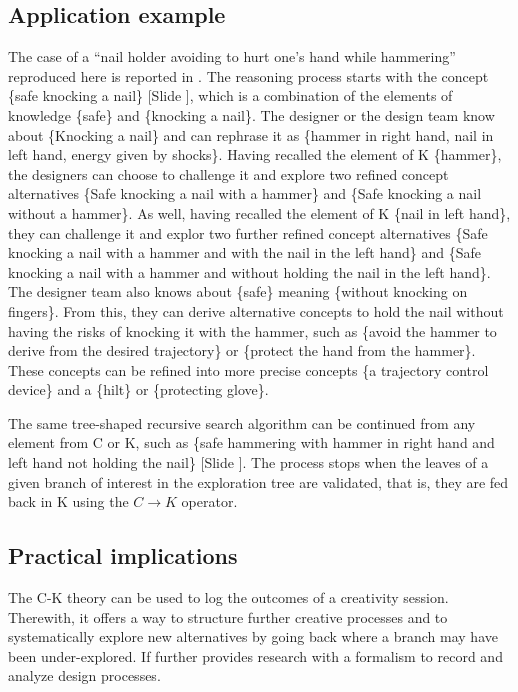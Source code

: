 \documentclass{article}
\newcounter{slide}
\begin{document}
\subsection{Application example}
\label{sec:CKExample}
The case of a ``nail holder avoiding to hurt one's hand while hammering'' reproduced here is reported in \cite{hatchuel2004ck}.
The reasoning process starts with the concept \{safe knocking a nail\} {\color{blue}[Slide ]}, which is a combination of the elements of knowledge \{safe\} and \{knocking a nail\}. The designer or the design team know about \{Knocking a nail\} and can rephrase it as \{hammer in right hand, nail in left hand, energy given by shocks\}. Having recalled the element of K \{hammer\}, the designers can choose to challenge it and explore two refined concept alternatives \{Safe knocking a nail with a hammer\} and \{Safe knocking a nail without a hammer\}. As well, having recalled the element of K \{nail in left hand\}, they can challenge it and explor two further refined concept alternatives \{Safe knocking a nail with a hammer and with the nail in the left hand\} and \{Safe knocking a nail with a hammer and without holding the nail in the left hand\}. The designer team also knows about \{safe\} meaning \{without knocking on fingers\}. From this, they can derive alternative concepts to hold the nail without having the risks of knocking it with the hammer, such as \{avoid the hammer to derive from the desired trajectory\} or \{protect the hand from the hammer\}. These concepts can be refined into more precise concepts \{a trajectory control device\} and a \{hilt\} or \{protecting glove\}. 

The same tree-shaped recursive search algorithm can be continued from any element from C or K, such as \{safe hammering with hammer in right hand and left hand not holding the nail\} {\color{blue}[Slide ]}. The process stops when the leaves of a given branch of interest in the exploration tree are validated, that is, they are fed back in K using the $C\rightarrow K$ operator.

\subsection{Practical implications}
\label{sec:practicalimplicationsthree}
The C-K theory can be used to log the outcomes of a creativity session. Therewith, it offers a way to structure further creative processes and to systematically explore new alternatives by going back where a branch may have been under-explored. If further provides research with a formalism to record and analyze design processes. 
\end{document}
